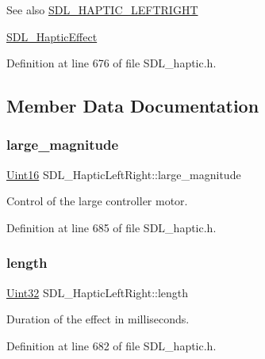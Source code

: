 \begin{DoxySeeAlso}{See also}
\mbox{\hyperlink{_s_d_l__haptic_8h_ae047624d8458ff6400887c37a36f86d3}{S\+D\+L\+\_\+\+H\+A\+P\+T\+I\+C\+\_\+\+L\+E\+F\+T\+R\+I\+G\+HT}} 

\mbox{\hyperlink{union_s_d_l___haptic_effect}{S\+D\+L\+\_\+\+Haptic\+Effect}} 
\end{DoxySeeAlso}


Definition at line 676 of file S\+D\+L\+\_\+haptic.\+h.



\subsection{Member Data Documentation}
\mbox{\label{struct_s_d_l___haptic_left_right_a8cd16fe2200ef10cc4f3b4209adef959}} 
\subsubsection{\texorpdfstring{large\_magnitude}{large\_magnitude}}
{\footnotesize\ttfamily \mbox{\hyperlink{_s_d_l__stdinc_8h_a31fcc0a076c9068668173ee26d33e42b}{Uint16}} S\+D\+L\+\_\+\+Haptic\+Left\+Right\+::large\+\_\+magnitude}

Control of the large controller motor. 

Definition at line 685 of file S\+D\+L\+\_\+haptic.\+h.

\mbox{\label{struct_s_d_l___haptic_left_right_a5b942fee53f1ec77d3fb91a6e89b0196}} 
\subsubsection{\texorpdfstring{length}{length}}
{\footnotesize\ttfamily \mbox{\hyperlink{_s_d_l__stdinc_8h_add440eff171ea5f55cb00c4a9ab8672d}{Uint32}} S\+D\+L\+\_\+\+Haptic\+Left\+Right\+::length}

Duration of the effect in milliseconds. 

Definition at line 682 of file S\+D\+L\+\_\+haptic.\+h.

\mbox{\label{struct_s_d_l___haptic_left_right_aaa1f2c1e767a780e447d82efce6cd1cf}} 
